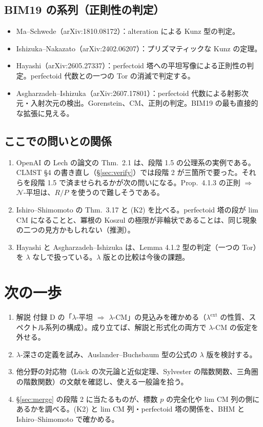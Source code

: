 \documentclass[11pt,a4paper]{ltjsarticle}
\theoremstyle{plain}
\theoremstyle{definition}
\theoremstyle{remark}
\theoremstyle{plain}
\begin{document}
\subsection{BIM19 の系列（正則性の判定）}
\begin{itemize}
  \item Ma--Schwede（arXiv:1810.08172）：alteration による Kunz 型の判定。
  \item Ishizuka--Nakazato（arXiv:2402.06207）：プリズマティックな Kunz の定理。
  \item Hayashi（arXiv:2605.27337）：perfectoid 塔への平坦写像による正則性の判定。perfectoid 代数との一つの Tor の消滅で判定する。
  \item Asgharzadeh--Ishizuka（arXiv:2607.17801）：perfectoid 代数による射影次元・入射次元の検出。Gorenstein、CM、正則の判定。BIM19 の最も直接的な拡張に見える。
\end{itemize}

\subsection{ここでの問いとの関係}
\begin{enumerate}
  \item OpenAI の Lech の論文の Thm.~2.1 は、段階 1.5 の公理系の実例である。CLMST \S 4 の書き直し（\S\ref{sec:verify}）では段階 2 が三箇所で要った。それらを段階 1.5 で済ませられるかが次の問いになる。Prop.~4.1.3 の正則 $\Rightarrow$ $\mathcal{N}$-平坦は、$R/P$ を使うので難しそうである。
  \item Ishiro--Shimomoto の Thm.~3.17 と (K2) を比べる。perfectoid 塔の段が lim CM になることと、冪根の Koszul の極限が非輪状であることは、同じ現象の二つの見方かもしれない（推測）。
  \item Hayashi と Asgharzadeh--Ishizuka は、Lemma 4.1.2 型の判定（一つの Tor）を $\lambda$ なしで扱っている。$\lambda$ 版との比較は今後の課題。
\end{enumerate}

\section{次の一歩}
\begin{enumerate}
  \item 解説 付録 D の「$\lambda$-平坦 $\Rightarrow$ $\lambda$-CM」の見込みを確かめる（$\lambda^{\mathrm{ext}}$ の性質、スペクトル系列の構成）。成り立てば、解説と形式化の両方で $\lambda$-CM の仮定を外せる。
  \item $\lambda$-深さの定義を試み、Auslander--Buchsbaum 型の公式の $\lambda$ 版を検討する。
  \item 他分野の対応物（Lück の次元論と近似定理、Sylvester の階数関数、三角圏の階数関数）の文献を確認し、使える一般論を拾う。
  \item \S\ref{sec:merge} の段階 2 に当たるものが、標数 $p$ の完全化や lim CM 列の側にあるかを調べる。(K2) と lim CM 列・perfectoid 塔の関係を、BHM と Ishiro--Shimomoto で確かめる。
\end{enumerate}
\end{document}
